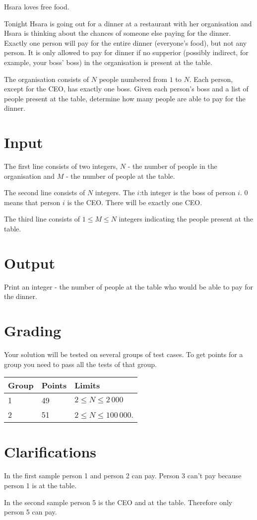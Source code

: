 
Hsara loves free food.

Tonight Hsara is going out for a dinner at a restaurant with her organisation and Hsara is thinking about the chances of someone else paying for the dinner. Exactly one person will pay for the entire dinner (everyone's food), but not any person. It is only allowed to pay for dinner if no supperior (possibly indirect, for example, your boss' boss) in the organisation is present at the table.

The organisation consists of $N$ people numbered from $1$ to $N$. Each person, except for the CEO, has exactly one boss. Given each person's boss and a list of people present at the table, determine how many people are able to pay for the dinner.

\section*{Input}

The first line consists of two integers, $N$ - the number of people in the organisation and $M$ - the number of people at the table.

The second line consists of $N$ integers. The $i$:th integer is the boss of person $i$. 0 means that person $i$ is the CEO. There will be exactly one CEO.

The third line consists of $1 \le M \le N$ integers indicating the people present at the table.

\section*{Output}
Print an integer - the number of people at the table who would be able to pay for the dinner.

\section*{Grading}
Your solution will be tested on several groups of test cases. To get points for a group you need to pass all the tests of that group.

\begin{tabular}{| l | l | l |}
	\hline
	Group & Points & Limits\\ \hline
  1     & 49         & $2 \le N \le 2\,000$ \\ \hline
  2     & 51         & $2 \le N \le 100\,000$. \\ \hline
\end{tabular}

\section*{Clarifications}
In the first sample person 1 and person 2 can pay. Person 3 can't pay because person 1 is at the table.

In the second sample person 5 is the CEO and at the table. Therefore only person 5 can pay.
